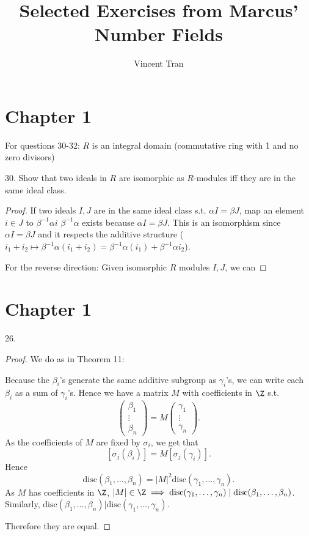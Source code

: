 \documentclass[a4paper]{article}
\title{Selected Exercises from Marcus' Number Fields}
\author{Vincent Tran}
\begin{document}
\maketitle

\section{Chapter 1}

For questions 30-32: $R $ is an integral domain (commutative ring with 1 and no zero divisors)

30. Show that two ideals in $R $ are isomorphic as $R $-modules iff they are in the same ideal class.
\begin{proof}
	If two ideals $I,J $ are in the same ideal class s.t. $\alpha I = \beta J $, map an element $i\in J $ to $\beta ^{-1} \alpha i $ $\beta ^{-1}\alpha  $ exists because $\alpha I = \beta J $.
	This is an isomorphism since $\alpha I = \beta J $ and it respects the additive structure ($i_{1}+i_{2} \mapsto \beta ^{-1} \alpha (i_{1}+i_{2}) = \beta ^{-1}\alpha (i_{1})+\beta ^{-1}\alpha i_{2}$).

	For the reverse direction:
	Given isomorphic $R $ modules $I,J $, we can
\end{proof}

\section{Chapter 1}

26.

\begin{proof}
	We do as in Theorem 11:

	Because the $\beta_i $'s generate the same additive subgroup as $\gamma_i $'s, we can write each $\beta _i $ as a sum of $\gamma_i $'s.
	Hence we have a matrix $M $ with coefficients in $\Z $ s.t.
	\[
		\begin{pmatrix} \beta _1\\ \vdots\\ \beta _n \end{pmatrix} = M \begin{pmatrix} \gamma _1\\ \vdots\\ \gamma _n \end{pmatrix}
	.\]
	As the coefficients of $M $ are fixed by $\sigma_i $, we get that
	\[
		[\sigma_j(\beta_i)] = M[\sigma_j(\gamma_i)]
	.\]
	Hence
	\[
		\text{disc}(\beta_{1},\ldots ,\beta _n) = |M|^2\text{disc}(\gamma_{1},\ldots ,\gamma _n)
	.\]
	As $M $ has coefficients in $\Z $, $|M| \in \Z \implies \text{disc}(\gamma_{1},\ldots,\gamma _n) \mid \text{disc}(\beta_{1},\ldots ,\beta_n)$.
	Similarly, $\text{disc}(\beta_{1},\ldots ,\beta _n) | \text{disc}(\gamma_{1},\ldots ,\gamma_n) $.

	Therefore they are equal.
\end{proof}
\end{document}
